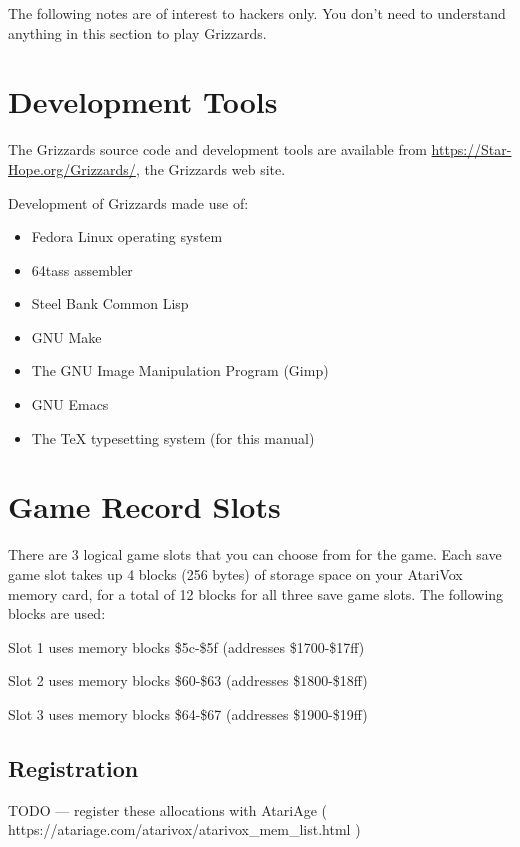 \documentclass[12pt,twoside]{memoir}
\begin{document}
\begin{description}
The following notes are of interest to hackers only. You don't need to
understand anything in this section to play Grizzards.

\section{Development Tools}

The  Grizzards source  code  and development  tools  are available  from
\href{https://Star-Hope.org/Grizzards/}{https://Star-Hope.org/Grizzards/},
the Grizzards web site.

Development of Grizzards made use of:

\begin{itemize}
\item Fedora Linux operating system
\item 64tass assembler
\item Steel Bank Common Lisp
\item GNU Make
\item The GNU Image Manipulation Program (Gimp)
\item GNU Emacs
\item The \TeX{} typesetting system (for this manual)
\end{itemize}

\section{Game Record Slots}

There are 3  logical game slots that  you can choose from  for the game.
Each save game  slot takes up 4  blocks (256 bytes) of  storage space on
your AtariVox memory card,  for a total of 12 blocks  for all three save
game slots. The following blocks are used:

\begin{enumeration}
\item Slot 1 uses memory blocks \$5c-\$5f (addresses \$1700-\$17ff)
\item Slot 2 uses memory blocks \$60-\$63 (addresses \$1800-\$18ff)
\item Slot 3 uses memory blocks \$64-\$67 (addresses \$1900-\$19ff)
\end{enumeration}

\subsection{Registration}

TODO --- register these allocations with AtariAge (
https://atariage.com/atarivox/atarivox\_mem\_list.html )


\end{description}
\end{document}
